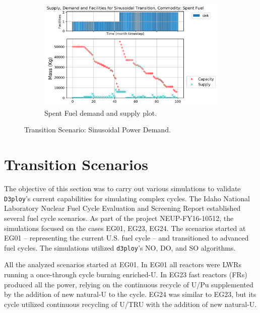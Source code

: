 \documentclass[11pt,letterpaper]{article}
\begin{document}
\begin{figure}[!htbp]
\begin{subfigure}[t]{0.45\textwidth}
	    \label{fig:sinetransition-fuel}
    \end{subfigure}
    \hfill
    \begin{subfigure}[t]{0.45\textwidth}
        \centering
        \includegraphics[width=\linewidth]{figures/sinetransition-spentfuel.png} 
        \caption{Spent Fuel demand and supply plot.}
        \label{fig:sinetransition-spentfuel}
    \end{subfigure}
    \caption{Transition Scenario: Sinusoidal Power Demand.}
\end{figure}

\pagebreak
\section{Transition Scenarios}

The objective of this section was to carry out various simulations to validate 
\texttt{D3ploy}'s current capabilities for simulating complex cycles.
The Idaho National Laboratory Nuclear Fuel Cycle Evaluation and Screening Report \cite{wigeland_nuclear_2014} established several fuel cycle scenarios.
As part of the project NEUP-FY16-10512, the simulations focused on the cases EG01, EG23, EG24. The scenarios started at EG01 -- representing the current U.S. fuel cycle -- and transitioned to advanced fuel cycles.
The simulations utilized \texttt{d3ploy}'s NO, DO, and SO algorithms.

All the analyzed scenarios started at EG01. In EG01 all reactors were LWRs running a  once-through cycle burning enriched-U.
In EG23 fast reactors (FRs) produced all the power, relying on the continuous recycle of U/Pu supplemented by the addition of new natural-U to the cycle.
EG24 was similar to EG23, but its cycle utilized continuous recycling of U/TRU with the addition of new natural-U.
\end{document}
